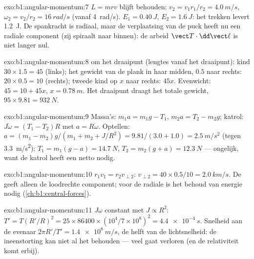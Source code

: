\begin{solution}{exo:b1:angular-momentum:7}
$L = mrv$ blijft behouden: $v_2 = v_1r_1/r_2 = \qty{4.0}{m/s}$, $\omega_2 = v_2/r_2
= \qty{16}{rad/s}$ (vanaf \qty{4}{rad/s}). $E_1 = \qty{0.40}{J}$, $E_2 =
\qty{1.6}{J}$: het trekken levert \qty{1.2}{J}. De spankracht is radiaal, maar de
verplaatsing van de puck heeft nu een radiale component (zij spiraalt naar binnen): de arbeid
$\vect T\cdot\dd\vect\ell$ is niet langer nul.
\end{solution}

\begin{solution}{exo:b1:angular-momentum:8}
 om het draaipunt (lengtes vanaf het draaipunt): kind $30 \times 1.5 =
45$ (links); het gewicht van de plank in haar midden, $0.5$ naar rechts: $20 \times
0.5 = 10$ (rechts); tweede kind op $x$ naar rechts: $45x$. Evenwicht:
$45 = 10 + 45x$, $x = \qty{0.78}{m}$. Het draaipunt draagt het totale gewicht,
$95 \times 9.81 = \qty{932}{N}$.
\end{solution}

\begin{solution}{exo:b1:angular-momentum:9}
Massa's: $m_1a = m_1g - T_1$, $m_2a = T_2 - m_2g$; katrol: $J\dot\omega =
(T_1 - T_2)R$ met $a = R\dot\omega$. Optellen: $a = (m_1 - m_2)g/(m_1 + m_2 +
J/R^2) = 9.81/(3.0 + 1.0) = \qty{2.5}{m/s^2}$ (tegen \qty{3.3}{m/s^2});
$T_1 = m_1(g - a) = \qty{14.7}{N}$, $T_2 = m_2(g + a) = \qty{12.3}{N}$ ---
ongelijk, want de katrol heeft een netto  nodig.
\end{solution}

\begin{solution}{exo:b1:angular-momentum:10}
$r_1v_1 = r_2v_{\perp 2}$: $v_{\perp 2} = 40 \times 0.5/10 = \qty{2.0}{km/s}$.
De  geeft alleen de loodrechte component; voor de radiale is
het behoud van energie nodig (\cref{ch:b1:central-forces}).
\end{solution}

\begin{solution}{exo:b1:angular-momentum:11}
$J\omega$ constant met $J \propto R^2$: $T' = T(R'/R)^2 = 25 \times 86400
\times (10^4/7\times10^8)^2 = \qty{4.4e-4}{s}$. Snelheid aan de evenaar $2\pi R'/T'
= \qty{1.4e8}{m/s}$, de helft van de lichtsnelheid: de ineenstorting kan niet
al het  behouden --- veel gaat verloren (en de relativiteit komt erbij).
\end{solution}

